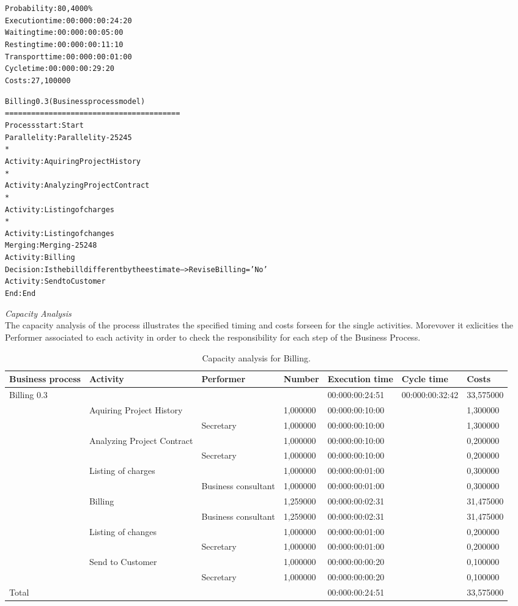 \begin{alltt}
Probability:   80,4000\%
Execution time:  00:000:00:24:20
Waiting time:  00:000:00:05:00
Resting time:  00:000:00:11:10
Transport time:  00:000:00:01:00
Cycle time:  00:000:00:29:20
Costs:  27,100000

Billing 0.3 (Business process model)
========================================
Process start: Start
Parallelity: Parallelity-25245
    *
    Activity: Aquiring Project History
    *
    Activity: Analyzing Project Contract
    *
    Activity: Listing of charges
    *
    Activity: Listing of changes
Merging: Merging-25248
Activity: Billing
Decision: Is the bill different by the estimate --> ReviseBilling = 'No'
Activity: Send to Customer
End: End
\end{alltt}

\noindent
\emph{Capacity Analysis}\\
The capacity analysis of the process illustrates the specified timing and costs forseen for the single activities. Morevover it exlicities the Performer associated to each activity in order to check the responsibility for each step of the Business Process.

\begin{table}
\centering
{\tiny
\begin{tabular}{|l|l|l|l|l|l|l|}
Business process&Activity&Performer&Number&Execution time&Cycle time&Costs\\
\hline
Billing 0.3&&&&00:000:00:24:51&00:000:00:32:42&33,575000\\
\hline
&Aquiring Project History &&1,000000&00:000:00:10:00&&1,300000\\
\hline
&&Secretary&1,000000&00:000:00:10:00&&1,300000\\
\hline
&Analyzing Project Contract &&1,000000&00:000:00:10:00&&0,200000\\
\hline
&&Secretary&1,000000&00:000:00:10:00&&0,200000\\
\hline
&Listing of charges &&1,000000&00:000:00:01:00&&0,300000\\
\hline
&&Business consultant&1,000000&00:000:00:01:00&&0,300000\\
\hline
&Billing &&1,259000&00:000:00:02:31&&31,475000\\
\hline
&&Business consultant&1,259000&00:000:00:02:31&&31,475000\\
\hline
&Listing of changes &&1,000000&00:000:00:01:00&&0,200000\\
\hline
&&Secretary&1,000000&00:000:00:01:00&&0,200000\\
\hline
&Send to Customer &&1,000000&00:000:00:00:20&&0,100000\\
\hline
&&Secretary&1,000000&00:000:00:00:20&&0,100000\\
\hline
Total&&&&00:000:00:24:51&&33,575000
\end{tabular}
}
\caption{Capacity analysis for Billing.}
\end{table}
%

